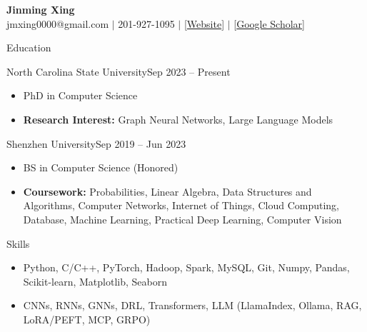 \documentclass[]{mcdowellcv}
\begin{document}
\begin{center}
    \thispagestyle{empty}
    \Large \textbf{Jinming Xing \\}
    \vspace{1mm}
    \normalsize jmxing0000@gmail.com $\mid$ 201-927-1095 $\mid$  [\href{https://xingjinming-real.github.io/}{Website}] $\mid$ [\href{https://scholar.google.com/citations?user=gDGHaU8AAAAJ}{Google Scholar}]\\
\end{center}

\begin{cvsection}{Education}
    \begin{cvsubsection}{North Carolina State University}{}{Sep 2023 -- Present}
        \begin{itemize}
            \item PhD in Computer Science %
            \item \textbf{Research Interest:} Graph Neural Networks, Large Language Models
        \end{itemize}
    \end{cvsubsection}
    \vspace*{-6pt}
    \begin{cvsubsection}{Shenzhen University}{}{Sep 2019 -- Jun 2023}
        \begin{itemize}
            \item BS in Computer Science (Honored)
            \item \textbf{Coursework:} Probabilities, Linear Algebra, Data Structures and Algorithms, Computer Networks, Internet of Things, Cloud Computing, Database, Machine Learning, Practical Deep Learning, Computer Vision
        \end{itemize}
    \end{cvsubsection}
\end{cvsection}
\vspace*{-12pt}
\begin{cvsection}{Skills}
    \begin{cvsubsection}{}{}{}
        \begin{itemize}
            \item Python, C/C++, PyTorch, Hadoop, Spark, MySQL, Git, Numpy, Pandas, Scikit-learn, Matplotlib, Seaborn
            \item CNNs, RNNs, GNNs, DRL, Transformers, LLM (LlamaIndex, Ollama, RAG, LoRA/PEFT, MCP, GRPO)
        \end{itemize}
    \end{cvsubsection}
\end{cvsection}
\end{document}

